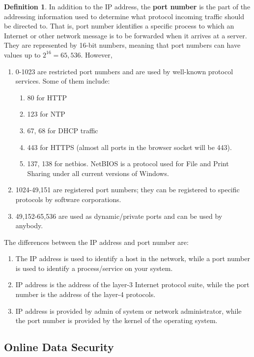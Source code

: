 \documentclass[a4paper, 12pt]{report}
\theoremstyle{remark}
\theoremstyle{definition}
\newtheorem{definition}{Definition}[section]
\begin{document}
\begin{definition}
In addition to the IP address, the \textbf{port number} is the part of the addressing information used to determine what protocol incoming traffic should be directed to. That is, port number identifies a specific process to which an Internet or other network message is to be forwarded when it arrives at a server. They are represented by 16-bit numbers, meaning that port numbers can have values up to $2^{16} = 65,536$. However,
\begin{enumerate}
    \item 0-1023 are restricted port numbers and are used by well-known protocol services. Some of them include:
    \begin{enumerate}
        \item 80 for HTTP
        \item 123 for NTP
        \item 67, 68 for DHCP traffic
        \item 443 for HTTPS (almost all ports in the browser socket will be 443). 
        \item 137, 138 for netbios. NetBIOS is a protocol used for File and Print Sharing under all current versions of Windows. 
    \end{enumerate}
    \item 1024-49,151 are registered port numbers; they can be registered to specific protocols by software corporations.
    \item 49,152-65,536 are used as dynamic/private ports and can be used by anybody. 
\end{enumerate}
\end{definition}

The differences between the IP address and port number are: 
\begin{enumerate}
    \item The IP address is used to identify a host in the network, while a port number is used to identify a process/service on your system. 
    \item IP address is the address of the layer-3 Internet protocol suite, while the port number is the address of the layer-4 protocols. 
    \item IP address is provided by admin of system or network administrator, while the port number is provided by the kernel of the operating system. 
\end{enumerate}


\subsection{Online Data Security}
\end{document}
